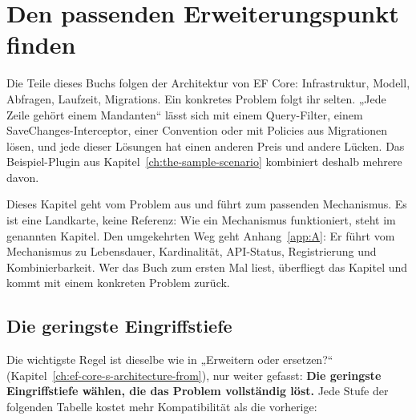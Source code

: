 \chapter{Den passenden Erweiterungspunkt finden}\label{ch:choosing-the-right-extension-point}

Die Teile dieses Buchs folgen der Architektur von EF Core: Infrastruktur, Modell, Abfragen,
Laufzeit, Migrations. Ein konkretes Problem folgt ihr selten. „Jede Zeile gehört einem
Mandanten“ lässt sich mit einem Query-Filter, einem SaveChanges-Interceptor, einer
Convention oder mit Policies aus Migrationen lösen, und jede dieser Lösungen hat einen
anderen Preis und andere Lücken. Das Beispiel-Plugin aus
Kapitel~\ref{ch:the-sample-scenario} kombiniert deshalb mehrere davon.

Dieses Kapitel geht vom Problem aus und führt zum passenden Mechanismus. Es ist eine
Landkarte, keine Referenz: Wie ein Mechanismus funktioniert, steht
im genannten Kapitel. Den umgekehrten Weg geht Anhang~\ref{app:A}: Er führt vom
Mechanismus zu Lebensdauer, Kardinalität, API-Status, Registrierung und Kombinierbarkeit. Wer das Buch zum ersten Mal liest, überfliegt das Kapitel und kommt mit
einem konkreten Problem zurück.

\section{Die geringste Eingriffstiefe}

Die wichtigste Regel ist dieselbe wie in „Erweitern oder ersetzen?“
(Kapitel~\ref{ch:ef-core-s-architecture-from}), nur weiter gefasst:
\textbf{Die geringste Eingriffstiefe wählen, die das Problem vollständig löst.} Jede Stufe
der folgenden Tabelle kostet mehr Kompatibilität als die vorherige:

